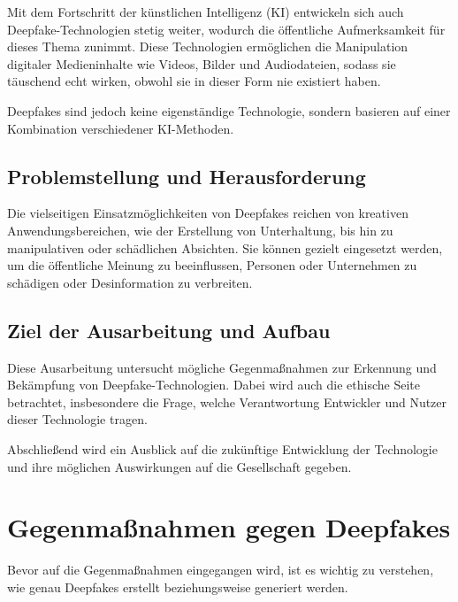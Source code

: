 \documentclass[a4paper,12pt]{article}
\begin{document}
Mit dem Fortschritt der künstlichen Intelligenz (KI) entwickeln sich auch Deepfake-Technologien stetig weiter, wodurch die öffentliche Aufmerksamkeit für dieses Thema zunimmt. 
Diese Technologien ermöglichen die Manipulation digitaler Medieninhalte wie Videos, Bilder und Audiodateien, sodass sie täuschend echt wirken, obwohl sie in dieser Form nie existiert haben.

Deepfakes sind jedoch keine eigenständige Technologie, sondern basieren auf einer Kombination verschiedener KI-Methoden. \cite{BVDW2024}\\

\subsection{Problemstellung und Herausforderung}
Die vielseitigen Einsatzmöglichkeiten von Deepfakes reichen von kreativen Anwendungsbereichen, wie der Erstellung von Unterhaltung, bis hin zu manipulativen oder schädlichen Absichten. 
Sie können gezielt eingesetzt werden, um die öffentliche Meinung zu beeinflussen, Personen oder Unternehmen zu schädigen oder Desinformation zu verbreiten. \cite{CounterExtremism2020}\\

\subsection{Ziel der Ausarbeitung und Aufbau}
Diese Ausarbeitung untersucht mögliche Gegenmaßnahmen zur Erkennung und Bekämpfung von Deepfake-Technologien. 
Dabei wird auch die ethische Seite betrachtet, insbesondere die Frage, welche Verantwortung Entwickler und Nutzer dieser Technologie tragen.  

Abschließend wird ein Ausblick auf die zukünftige Entwicklung der Technologie und ihre möglichen Auswirkungen auf die Gesellschaft gegeben.
\newpage

\section{Gegenmaßnahmen gegen Deepfakes}
Bevor auf die Gegenmaßnahmen eingegangen wird, ist es wichtig zu verstehen, wie genau Deepfakes erstellt beziehungsweise generiert werden.
\end{document}
